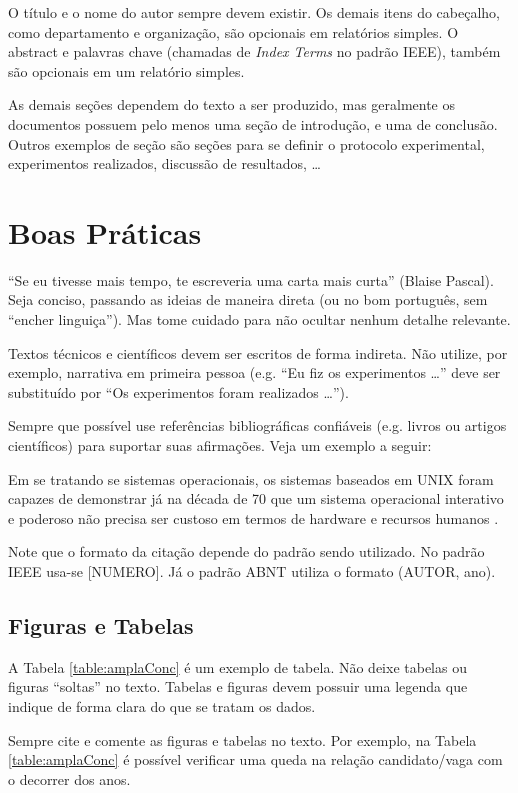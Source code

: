 \documentclass[conference]{IEEEtran}
\begin{document}
O título e o nome do autor sempre devem existir. Os demais itens do cabeçalho, como departamento e organização, são opcionais em relatórios simples. O abstract e palavras chave (chamadas de \textit{Index Terms} no padrão \ac{IEEE}), também são opcionais em um relatório simples.

As demais seções dependem do texto a ser produzido, mas geralmente os documentos possuem pelo menos uma seção de introdução, e uma de conclusão. Outros exemplos de seção são seções para se definir o protocolo experimental, experimentos realizados, discussão de resultados, \dots

\section{Boas Práticas}

``Se eu tivesse mais tempo, te escreveria uma carta mais curta'' (Blaise Pascal). Seja conciso, passando as ideias de maneira direta (ou no bom português, sem ``encher linguiça''). Mas tome cuidado para não ocultar nenhum detalhe relevante.

Textos técnicos e científicos devem ser escritos de forma indireta. Não utilize, por exemplo, narrativa em primeira pessoa (e.g. ``Eu fiz os experimentos \dots'' deve ser substituído por ``Os experimentos foram realizados \dots'').

Sempre que possível use referências bibliográficas confiáveis (e.g. livros ou artigos científicos) para suportar suas afirmações. Veja um exemplo a seguir:

Em se tratando se sistemas operacionais, os sistemas baseados em UNIX foram capazes de demonstrar já na década de 70 que um sistema operacional interativo e poderoso não precisa ser custoso em termos de hardware e recursos humanos \cite{ritchieThompson1978}.

Note que o formato da citação depende do padrão sendo utilizado. No padrão \ac{IEEE} usa-se [NUMERO]. Já o padrão \ac{ABNT} utiliza o formato (AUTOR, ano).


\subsection{Figuras e Tabelas}

A Tabela \ref{table:amplaConc} é um exemplo de tabela. Não deixe tabelas ou figuras ``soltas'' no texto. Tabelas e figuras devem possuir uma legenda que indique de forma clara do que se tratam os dados.

Sempre cite e comente as figuras e tabelas no texto. Por exemplo, na Tabela \ref{table:amplaConc} é possível verificar uma queda na relação candidato/vaga com o decorrer dos anos.
\end{document}
